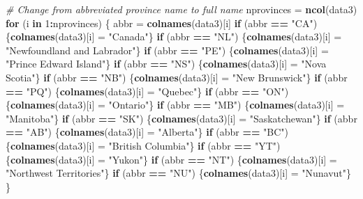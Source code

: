 \documentclass[9pt,letter]{article}
\newenvironment{Shaded}{\begin{snugshade}}{\end{snugshade}}
\newcommand{\KeywordTok}[1]{\textcolor[rgb]{0.13,0.29,0.53}{\textbf{#1}}}
\newcommand{\DecValTok}[1]{\textcolor[rgb]{0.00,0.00,0.81}{#1}}
\newcommand{\StringTok}[1]{\textcolor[rgb]{0.31,0.60,0.02}{#1}}
\newcommand{\CommentTok}[1]{\textcolor[rgb]{0.56,0.35,0.01}{\textit{#1}}}
\newcommand{\ControlFlowTok}[1]{\textcolor[rgb]{0.13,0.29,0.53}{\textbf{#1}}}
\newcommand{\OperatorTok}[1]{\textcolor[rgb]{0.81,0.36,0.00}{\textbf{#1}}}
\newcommand{\NormalTok}[1]{#1}
\begin{document}
\begin{Shaded}
\begin{Highlighting}[]
\CommentTok{# Change from abbreviated province name to full name}
\NormalTok{nprovinces =}\StringTok{ }\KeywordTok{ncol}\NormalTok{(data3)}
\ControlFlowTok{for}\NormalTok{ (i }\ControlFlowTok{in} \DecValTok{1}\OperatorTok{:}\NormalTok{nprovinces) \{}
\NormalTok{  abbr =}\StringTok{ }\KeywordTok{colnames}\NormalTok{(data3)[i]}
  \ControlFlowTok{if}\NormalTok{ (abbr }\OperatorTok{==}\StringTok{ "CA"}\NormalTok{) \{}\KeywordTok{colnames}\NormalTok{(data3)[i] =}\StringTok{ "Canada"}\NormalTok{\}}
  \ControlFlowTok{if}\NormalTok{ (abbr }\OperatorTok{==}\StringTok{ "NL"}\NormalTok{) \{}\KeywordTok{colnames}\NormalTok{(data3)[i] =}\StringTok{ "Newfoundland and Labrador"}\NormalTok{\}}
  \ControlFlowTok{if}\NormalTok{ (abbr }\OperatorTok{==}\StringTok{ "PE"}\NormalTok{) \{}\KeywordTok{colnames}\NormalTok{(data3)[i] =}\StringTok{ "Prince Edward Island"}\NormalTok{\}}
  \ControlFlowTok{if}\NormalTok{ (abbr }\OperatorTok{==}\StringTok{ "NS"}\NormalTok{) \{}\KeywordTok{colnames}\NormalTok{(data3)[i] =}\StringTok{ "Nova Scotia"}\NormalTok{\}}
  \ControlFlowTok{if}\NormalTok{ (abbr }\OperatorTok{==}\StringTok{ "NB"}\NormalTok{) \{}\KeywordTok{colnames}\NormalTok{(data3)[i] =}\StringTok{ "New Brunswick"}\NormalTok{\}}
  \ControlFlowTok{if}\NormalTok{ (abbr }\OperatorTok{==}\StringTok{ "PQ"}\NormalTok{) \{}\KeywordTok{colnames}\NormalTok{(data3)[i] =}\StringTok{ "Quebec"}\NormalTok{\}}
  \ControlFlowTok{if}\NormalTok{ (abbr }\OperatorTok{==}\StringTok{ "ON"}\NormalTok{) \{}\KeywordTok{colnames}\NormalTok{(data3)[i] =}\StringTok{ "Ontario"}\NormalTok{\}}
  \ControlFlowTok{if}\NormalTok{ (abbr }\OperatorTok{==}\StringTok{ "MB"}\NormalTok{) \{}\KeywordTok{colnames}\NormalTok{(data3)[i] =}\StringTok{ "Manitoba"}\NormalTok{\}}
  \ControlFlowTok{if}\NormalTok{ (abbr }\OperatorTok{==}\StringTok{ "SK"}\NormalTok{) \{}\KeywordTok{colnames}\NormalTok{(data3)[i] =}\StringTok{ "Saskatchewan"}\NormalTok{\}}
  \ControlFlowTok{if}\NormalTok{ (abbr }\OperatorTok{==}\StringTok{ "AB"}\NormalTok{) \{}\KeywordTok{colnames}\NormalTok{(data3)[i] =}\StringTok{ "Alberta"}\NormalTok{\}}
  \ControlFlowTok{if}\NormalTok{ (abbr }\OperatorTok{==}\StringTok{ "BC"}\NormalTok{) \{}\KeywordTok{colnames}\NormalTok{(data3)[i] =}\StringTok{ "British Columbia"}\NormalTok{\}}
  \ControlFlowTok{if}\NormalTok{ (abbr }\OperatorTok{==}\StringTok{ "YT"}\NormalTok{) \{}\KeywordTok{colnames}\NormalTok{(data3)[i] =}\StringTok{ "Yukon"}\NormalTok{\}}
  \ControlFlowTok{if}\NormalTok{ (abbr }\OperatorTok{==}\StringTok{ "NT"}\NormalTok{) \{}\KeywordTok{colnames}\NormalTok{(data3)[i] =}\StringTok{ "Northwest Territories"}\NormalTok{\}}
  \ControlFlowTok{if}\NormalTok{ (abbr }\OperatorTok{==}\StringTok{ "NU"}\NormalTok{) \{}\KeywordTok{colnames}\NormalTok{(data3)[i] =}\StringTok{ "Nunavut"}\NormalTok{\}}
\NormalTok{\}}


\end{Highlighting}
\end{Shaded}
\end{document}
